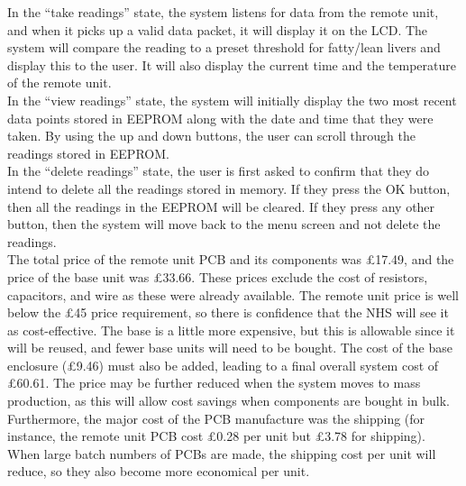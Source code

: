 In the ``take readings'' state, the system listens for data from the remote unit, and when it picks up a valid data packet, it will display it on the LCD. The system will compare the reading to a preset threshold for fatty/lean livers and display this to the user. It will also display the current time and the temperature of the remote unit.\\

In the ``view readings'' state, the system will initially display the two most recent data points stored in EEPROM along with the date and time that they were taken. By using the up and down buttons, the user can scroll through the readings stored in EEPROM.\\

In the ``delete readings'' state, the user is first asked to confirm that they do intend to delete all the readings stored in memory. If they press the OK button, then all the readings in the EEPROM will be cleared. If they press any other button, then the system will move back to the menu screen and not delete the readings.\\

The total price of the remote unit PCB and its components was £17.49, and the price of the base unit was £33.66. These prices exclude the cost of resistors, capacitors, and wire as these were already available. The remote unit price is well below the £45 price requirement, so there is confidence that the NHS will see it as cost-effective. The base is a little more expensive, but this is allowable since it will be reused, and fewer base units will need to be bought. The cost of the base enclosure (£9.46) must also be added, leading to a final overall system cost of £60.61. The price may be further reduced when the system moves to mass production, as this will allow cost savings when components are bought in bulk. Furthermore, the major cost of the PCB manufacture was the shipping (for instance, the remote unit PCB cost £0.28 per unit but £3.78 for shipping). When large batch numbers of PCBs are made, the shipping cost per unit will reduce, so they also become more economical per unit.
